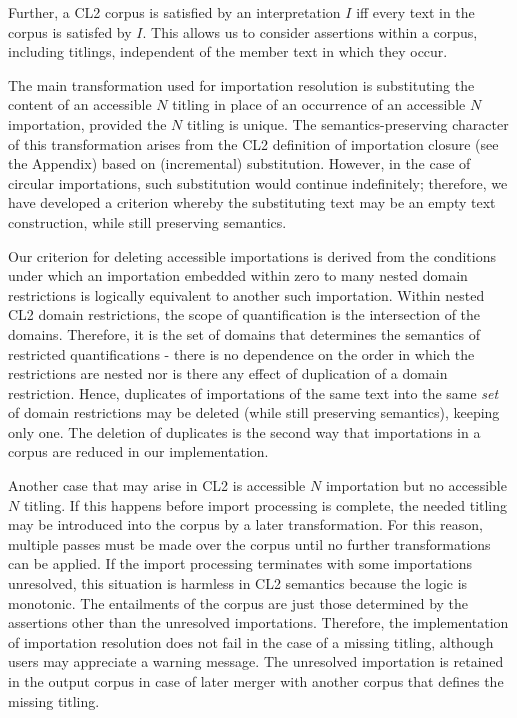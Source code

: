 \documentclass{IOS-Book-Article}
\begin{document}
{%
Further, a CL2 corpus is satisfied by an interpretation $I$ iff every text in the corpus is satisfed by $I$. This allows us to consider assertions within a corpus, including titlings, independent of the member text in which they occur.

The main transformation used for importation resolution is substituting the content of an accessible $N$ titling in place of an occurrence of an accessible $N$ importation, provided the $N$ titling is unique. The semantics-preserving character of this transformation arises from the CL2 definition of importation closure (see the Appendix) based on (incremental) substitution.
However, in the case of circular importations, such substitution would continue indefinitely; therefore, we have developed a criterion whereby the substituting text may be an empty text construction, while still preserving semantics.

Our criterion for deleting accessible importations is derived from the conditions under which an importation embedded within zero to many nested domain restrictions is logically equivalent to another such importation.
Within nested CL2 domain restrictions, the scope of quantification is the intersection of the domains.
Therefore, it is the set of domains that determines the semantics of restricted quantifications - 
there is no dependence on the order in which the restrictions are nested nor is there any effect of duplication of a domain restriction. 
Hence, duplicates of importations of the same text into the same \emph{set} of domain restrictions may be deleted (while still preserving semantics), keeping only one.  
The deletion of duplicates is the second way that importations in a corpus are reduced in our implementation.

Another case that may arise in CL2 is accessible $N$ importation but no accessible $N$ titling. 
If this happens before import processing is complete, the needed titling may be introduced into the corpus by a later transformation.
For this reason, multiple passes must be made over the corpus until no further transformations can be applied. 
If the import processing terminates with some importations unresolved, this situation is harmless in CL2 semantics because the logic is monotonic.
The entailments of the corpus are just those determined by the assertions other than the unresolved importations.
Therefore, the implementation of importation resolution does not fail in the case of a missing titling, although users may appreciate a warning message.
The unresolved importation is retained in the output corpus in case of later merger with another corpus that defines the missing titling.

}
\end{document}

